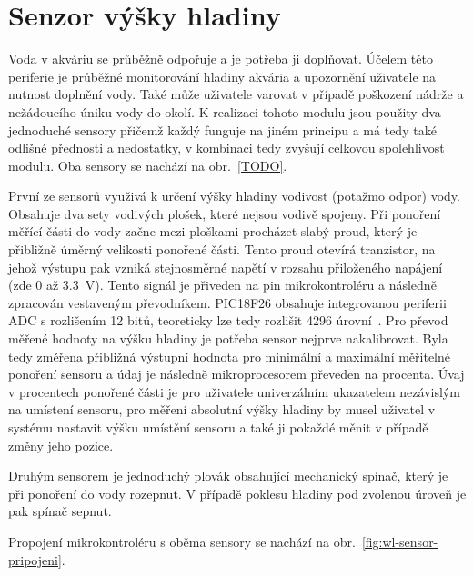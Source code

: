 \section{Senzor výšky hladiny}
\label{sec:perif-sensor-hladina}
    Voda v akváriu se průběžně odpořuje a je potřeba ji doplňovat. Účelem této periferie je průběžné monitorování hladiny akvária a upozornění uživatele na nutnost doplnění vody. Také může uživatele varovat v případě poškození nádrže a nežádoucího úniku vody do okolí. 
    K realizaci tohoto modulu jsou použity dva jednoduché sensory přičemž každý funguje na jiném principu a má tedy také odlišné přednosti a nedostatky, v kombinaci tedy zvyšují celkovou spolehlivost modulu. Oba sensory se nachází na obr.~\ref{TODO}. 

    První ze sensorů využivá k určení výšky hladiny vodivost (potažmo odpor) vody. Obsahuje dva sety vodivých plošek, které nejsou vodivě spojeny. Při ponoření měřící části do vody začne mezi ploškami procházet slabý proud, který je přibližně úměrný velikosti ponořené části. Tento proud otevírá tranzistor, na jehož výstupu pak vzniká stejnosměrné napětí v rozsahu přiloženého napájení (zde 0 až \qty{3.3}{V}). Tento signál je přiveden na pin mikrokontroléru a následně zpracován vestaveným převodníkem. PIC18F26 obsahuje integrovanou periferii ADC s rozlišením 12 bitů, teoreticky lze tedy rozlišit \num{4296} úrovní~\cite{PIC18F26Q83}. Pro převod měřené hodnoty na výšku hladiny je potřeba sensor nejprve nakalibrovat. Byla tedy změřena přibližná výstupní hodnota pro minimální a maximální měřitelné ponoření sensoru a údaj je následně mikroprocesorem převeden na procenta. Úvaj v procentech ponořené části je pro uživatele univerzálním ukazatelem nezávislým na umístení sensoru, pro měření absolutní výšky hladiny by musel uživatel v systému nastavit výšku umístění sensoru a také ji pokaždé měnit v případě změny jeho pozice.

    Druhým sensorem je jednoduchý plovák obsahující mechanický spínač, který je při ponoření do vody rozepnut. V případě poklesu hladiny pod zvolenou úroveň je pak spínač sepnut.

    Propojení mikrokontroléru s oběma sensory se nachází na obr.~\ref{fig:wl-sensor-pripojeni}.

